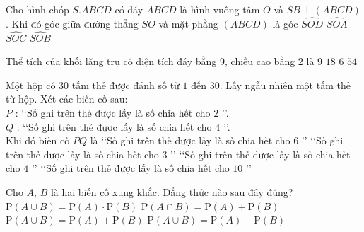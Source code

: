 \begin{ex}%
Cho hình chóp $S.ABCD$ có đáy $ABCD$ là hình vuông tâm $O$ và $SB \perp (ABCD)$. Khi đó góc giữa đường thẳng $SO$ và mặt phẳng $(ABCD)$ là góc
\choice
{$\widehat{SOD}$}
{$\widehat{SOA}$}
{$\widehat{SOC}$}
{\True $\widehat{SOB}$}
\end{ex}

\begin{ex}%
Thể tích của khối lăng trụ có diện tích đáy bằng $9$, chiều cao bằng $2$ là
\choice
{$9$}
{\True $18$}
{$6$}
{$54$}
\end{ex}

\begin{ex}%
Một hộp có $30$ tấm thẻ được đánh số từ $1$ đến $30$. Lấy ngẫu nhiên một tấm thẻ từ hộp. Xét các biến cố sau:\\
$P$ : \lq\lq Số ghi trên thẻ được lấy là số chia hết cho $2$ \rq\rq.\\
$Q$ : \lq\lq Số ghi trên thẻ được lấy là số chia hết cho $4$ \rq\rq.\\
Khi đó biến cố $PQ$ là
\choice
{\lq\lq Số ghi trên thẻ được lấy là số chia hết cho $6$ \rq\rq}
{\lq\lq Số ghi trên thẻ được lấy là số chia hết cho $3$ \rq\rq}
{\True \lq\lq Số ghi trên thẻ được lấy là số chia hết cho $4$ \rq\rq}
{\lq\lq Số ghi trên thẻ được lấy là số chia hết cho $10$ \rq\rq}
\end{ex}

\begin{ex}%
Cho $A$, $B$ là hai biến cố xung khắc. Đẳng thức nào sau đây đúng?
\choice
{$\mathrm {P}(A \cup B)=\mathrm {P}(A)\cdot \mathrm {P}(B)$}
{$\mathrm {P}(A \cap B)=\mathrm {P}(A)+\mathrm {P}(B)$}
{\True $\mathrm {P}(A \cup B)=\mathrm {P}(A)+\mathrm {P}(B)$}
{$\mathrm {P}(A \cup B)=\mathrm {P}(A)-\mathrm {P}(B)$}
\end{ex}

